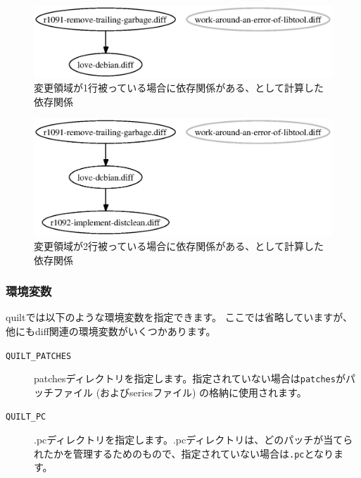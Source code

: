 \documentclass[mingoth,a4paper,twoside]{jsarticle}
\begin{document}
\begin{figure}[htbp]
  \begin{center}
   \includegraphics[scale=0.8]{image200701/patchdep-2.eps}
  \end{center}
  \caption{変更領域が1行被っている場合に依存関係がある、として計算した依存関係}
  \label{fig:patchdep-overlap-1line}
\end{figure}

\begin{figure}[htbp]
  \begin{center}
   \includegraphics[scale=0.8]{image200701/patchdep-3.eps}
  \end{center}
  \caption{変更領域が2行被っている場合に依存関係がある、として計算した依存関係}
  \label{fig:patchdep-overlap-2line}
\end{figure}

\subsubsection{環境変数}
\label{subsubsec:quilt-env}

quiltでは以下のような環境変数を指定できます。
ここでは省略していますが、他にもdiff関連の環境変数がいくつかあります。

\begin{description}
 \item[\texttt{QUILT\_PATCHES}] patchesディレクトリを指定します。指定されていない場合は\texttt{patches}がパッチファイル (およびseriesファイル) の格納に使用されます。
 \item[\texttt{QUILT\_PC}] .pcディレクトリを指定します。.pcディレクトリは、どのパッチが当てられたかを管理するためのもので、指定されていない場合は\texttt{.pc}となります。
\end{description}
\end{document}
